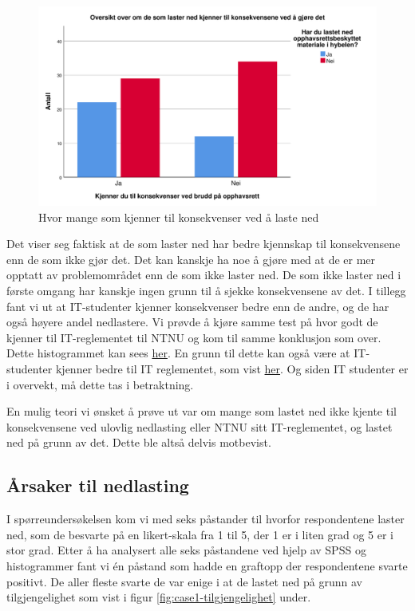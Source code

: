 \begin{figure}[H]
    \centering
    \includegraphics[scale=0.45]{case_1/bilder/konsekvens_lasterned.pdf}
    \caption[Konsekvens av å laste ned]{Hvor mange som kjenner til konsekvenser ved å laste ned}
    \label{fig:case1-konsekvens_lasterned}
\end{figure}

Det viser seg faktisk at de som laster ned har bedre kjennskap til konsekvensene enn de som ikke gjør det. Det kan kanskje ha noe å gjøre med at de er mer opptatt av problemområdet enn de som ikke laster ned. De som ikke laster ned i første omgang har kanskje ingen grunn til å sjekke konsekvensene av det. I tillegg fant vi ut at IT-studenter kjenner konsekvenser bedre enn de andre, og de har også høyere andel nedlastere. Vi prøvde å kjøre samme test på hvor godt de kjenner til IT-reglementet til NTNU \cite{ITReg} og kom til samme konklusjon som over. Dette histogrammet kan sees \hyperref[fig:reglement-lasterned]{her}. En grunn til dette kan også være at IT-studenter kjenner bedre til IT reglementet, som vist \hyperref[fig:reglement-fakultet]{her}. Og siden IT studenter er i overvekt, må dette tas i betraktning. 

En mulig teori vi ønsket å prøve ut var om mange som lastet ned ikke kjente til konsekvensene ved ulovlig nedlasting eller NTNU sitt IT-reglementet, og lastet ned på grunn av det. Dette ble altså delvis motbevist. 

\subsection{Årsaker til nedlasting}
I spørreundersøkelsen kom vi med seks påstander til hvorfor respondentene laster ned, som de besvarte på en likert-skala fra 1 til 5, der 1 er i liten grad og 5 er i stor grad. Etter å ha analysert alle seks påstandene ved hjelp av SPSS og histogrammer fant vi én påstand som hadde en graftopp der respondentene svarte positivt. De aller fleste svarte de var enige i at de lastet ned på grunn av tilgjengelighet som vist i figur \ref{fig:case1-tilgjengelighet} under.

